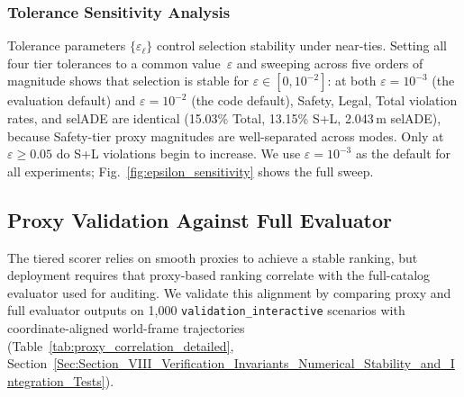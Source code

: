 \subsubsection{Tolerance Sensitivity Analysis}
\label{subsubsec:tolerance_sensitivity}

Tolerance parameters $\{\varepsilon_\ell\}$ control selection stability under near-ties.  Setting all four tier tolerances to a common value~$\varepsilon$ and sweeping across five orders of magnitude shows that selection is stable for $\varepsilon \in [0, 10^{-2}]$: at both $\varepsilon{=}10^{-3}$ (the evaluation default) and $\varepsilon{=}10^{-2}$ (the code default), Safety, Legal, Total violation rates, and selADE are identical (15.03\% Total, 13.15\% S+L, 2.043\,m selADE), because Safety-tier proxy magnitudes are well-separated across modes.  Only at $\varepsilon \geq 0.05$ do S+L violations begin to increase.  We use $\varepsilon{=}10^{-3}$ as the default for all experiments; Fig.~\ref{fig:epsilon_sensitivity} shows the full sweep.

\subsection{Proxy Validation Against Full Evaluator}
\label{subsec:proxy_validation}

The tiered scorer relies on smooth proxies to achieve a stable ranking, but deployment requires that proxy-based ranking correlate with the full-catalog evaluator used for auditing.  We validate this alignment by comparing proxy and full evaluator outputs on 1{,}000 \texttt{validation\_interactive} scenarios with coordinate-aligned world-frame trajectories (Table~\ref{tab:proxy_correlation_detailed}, Section~\ref{Sec:Section_VIII_Verification_Invariants_Numerical_Stability_and_Integration_Tests}).

